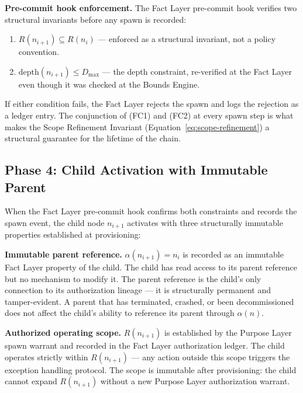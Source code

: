 \medskip
\noindent\textbf{Pre-commit hook enforcement.} The Fact Layer pre-commit hook verifies two structural invariants before any spawn is recorded:

\begin{enumerate}
    \item[(FC1)] $R(n_{i+1}) \subseteq R(n_i)$ --- enforced as a structural invariant, not a policy convention.
    \item[(FC2)] $\text{depth}(n_{i+1}) \leq D_{\max}$ --- the depth constraint, re-verified at the Fact Layer even though it was checked at the Bounds Engine.
\end{enumerate}

If either condition fails, the Fact Layer rejects the spawn and logs the rejection as a ledger entry. The conjunction of (FC1) and (FC2) at every spawn step is what makes the Scope Refinement Invariant (Equation~\ref{eq:scope-refinement}) a structural guarantee for the lifetime of the chain.

\subsection{Phase 4: Child Activation with Immutable Parent}
\label{sec:rs-child-activation}

When the Fact Layer pre-commit hook confirms both constraints and records the spawn event, the child node $n_{i+1}$ activates with three structurally immutable properties established at provisioning:

\medskip
\noindent\textbf{Immutable parent reference.} $\alpha(n_{i+1}) = n_i$ is recorded as an immutable Fact Layer property of the child. The child has read access to its parent reference but no mechanism to modify it. The parent reference is the child's only connection to its authorization lineage --- it is structurally permanent and tamper-evident. A parent that has terminated, crashed, or been decommissioned does not affect the child's ability to reference its parent through $\alpha(n)$.

\medskip
\noindent\textbf{Authorized operating scope.} $R(n_{i+1})$ is established by the Purpose Layer spawn warrant and recorded in the Fact Layer authorization ledger. The child operates strictly within $R(n_{i+1})$ --- any action outside this scope triggers the exception handling protocol. The scope is immutable after provisioning: the child cannot expand $R(n_{i+1})$ without a new Purpose Layer authorization warrant.

